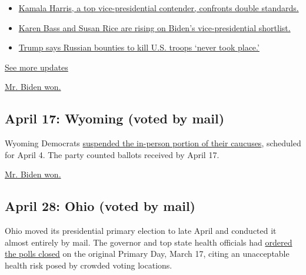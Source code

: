 \begin{itemize}
\tightlist
\item
  \href{https://www.nytimes.com/2020/07/31/us/elections/biden-vs-trump.html?action=click\&pgtype=Article\&state=default\&region=MAIN_CONTENT_1\&context=storylines_live_updates\#link-29fdff45}{Kamala
  Harris, a top vice-presidential contender, confronts double
  standards.}
\item
  \href{https://www.nytimes.com/2020/07/31/us/elections/biden-vs-trump.html?action=click\&pgtype=Article\&state=default\&region=MAIN_CONTENT_1\&context=storylines_live_updates\#link-13ec3d9c}{Karen
  Bass and Susan Rice are rising on Biden's vice-presidential
  shortlist.}
\item
  \href{https://www.nytimes.com/2020/07/31/us/elections/biden-vs-trump.html?action=click\&pgtype=Article\&state=default\&region=MAIN_CONTENT_1\&context=storylines_live_updates\#link-49e9a016}{Trump
  says Russian bounties to kill U.S. troops `never took place.'}
\end{itemize}

\href{https://www.nytimes.com/2020/07/31/us/elections/biden-vs-trump.html?action=click\&pgtype=Article\&state=default\&region=MAIN_CONTENT_1\&context=storylines_live_updates}{See
more updates}

\href{https://www.nytimes.com/2020/04/11/us/politics/alaska-primary.html}{Mr.
Biden won.}

\hypertarget{april-17-wyoming-voted-by-mail}{%
\subsection{April 17: Wyoming (voted by
mail)}\label{april-17-wyoming-voted-by-mail}}

Wyoming Democrats \href{https://www.wyodems.org/2020caucus}{suspended
the in-person portion of their caucuses}, scheduled for April 4. The
party counted ballots received by April 17.

\href{https://www.nytimes.com/interactive/2020/04/19/us/elections/results-wyoming-president-democrat-caucus-election.html}{Mr.
Biden won.}

\hypertarget{april-28-ohio-voted-by-mail}{%
\subsection{April 28: Ohio (voted by
mail)}\label{april-28-ohio-voted-by-mail}}

Ohio moved its presidential primary election to late April and conducted
it almost entirely by mail. The governor and top state health officials
had
\href{https://www.nytimes.com/2020/03/16/us/politics/virus-primary-2020-ohio.html}{ordered
the polls closed} on the original Primary Day, March 17, citing an
unacceptable health risk posed by crowded voting locations.

